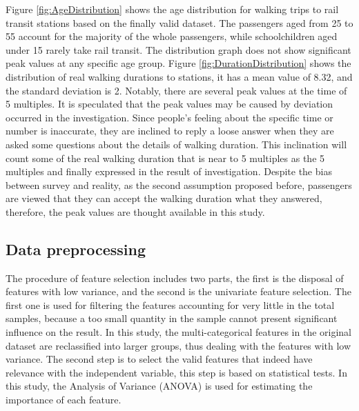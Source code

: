 \documentclass[Journal,letterpaper]{ascelike-new}
\begin{document}
%
Figure \ref{fig:AgeDistribution} shows the age distribution for walking trips to rail transit stations based on the finally valid dataset. The passengers aged from 25 to 55 account for the majority of the whole passengers, while schoolchildren aged under 15 rarely take rail transit. The distribution graph does not show significant peak values at any specific age group. Figure \ref{fig:DurationDistribution} shows the distribution of real walking durations to stations, it has a mean value of 8.32, and the standard deviation is 2. Notably, there are several peak values at the time of 5 multiples. It is speculated that the peak values may be caused by deviation occurred in the investigation. Since people's feeling about the specific time or number is inaccurate, they are inclined to reply a loose answer when they are asked some questions about the details of walking duration. This inclination will count some of the real walking duration that is near to 5 multiples as the 5 multiples and finally expressed in the result of investigation. Despite the bias between survey and reality, as the second assumption proposed before, passengers are viewed that they can accept the walking duration what they answered, therefore, the peak values are thought available in this study.

\subsection{Data preprocessing}
The procedure of feature selection includes two parts, the first is the disposal of features with low variance, and the second is the univariate feature selection. The first one is used for filtering the features accounting for very little in the total samples, because a too small quantity in the sample cannot present significant influence on the result. In this study, the multi-categorical features in the original dataset are reclassified into larger groups, thus dealing with the features with low variance. The second step is to select the valid features that indeed have relevance with the independent variable, this step is based on statistical tests. In this study, the Analysis of Variance (ANOVA) is used for estimating the importance of each feature.
\end{document}
